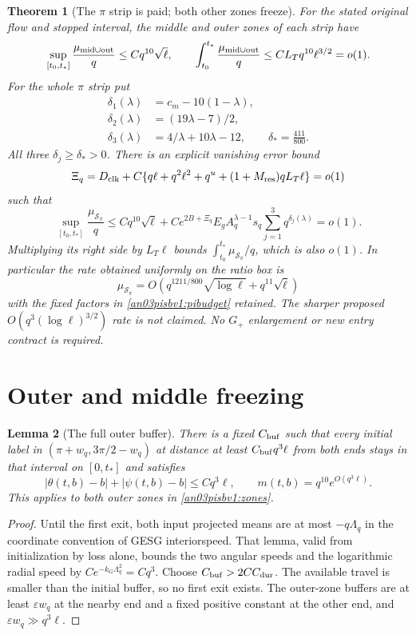 \documentclass[11pt]{article}
\numberwithin{equation}{section}
\newtheorem{theorem}{Theorem}[section]
\newtheorem{lemma}[theorem]{Lemma}
\theoremstyle{remark}\newtheorem{remark}[theorem]{Remark}
\newcommand{\Sp}{\mathcal S_\pi}
\begin{document}
\begin{theorem}[The $\pi$ strip is paid; both other zones freeze]
\label{an03pisbv1:main}
For the stated original flow and stopped interval, the middle and
outer zones of each strip have
\begin{equation}
 \sup_{[t_0,t_*]}\frac{\mu_{\rm mid\cup out}}q
       \le Cq^{10}\sqrt\ell,\qquad
 \int_{t_0}^{t_*}\frac{\mu_{\rm mid\cup out}}q
       \le CL_Tq^{10}\ell^{3/2}=o(1).
 \label{an03pisbv1:frozenbudget}
\end{equation}
For the whole $\pi$ strip put
\begin{align}
 \delta_1(\lambda)&=c_m-10(1-\lambda),\nonumber\\
 \delta_2(\lambda)&=(19\lambda-7)/2,\nonumber\\
 \delta_3(\lambda)&=4/\lambda+10\lambda-12,\qquad
 \delta_*=\frac{411}{800}.                         \label{an03pisbv1:powers}
\end{align}
All three $\delta_j\ge\delta_*>0$. There is an explicit vanishing
error bound
\[
 \Xi_q=D_{\rm clk}
       +C\{q\ell+q^2\ell^2+q^u+(1+M_{\rm res})qL_T\ell\}=o(1)
\]
such that
\begin{equation}
 \sup_{[t_0,t_*]}\frac{\mu_{\Sp}}q
 \le Cq^{10}\sqrt\ell+
     C e^{2B+\Xi_q}E_g A_q^{\lambda-1}s_q
                     \sum_{j=1}^3q^{\delta_j(\lambda)}
 =o(1).
 \label{an03pisbv1:pibudget}
\end{equation}
Multiplying its right side by $L_T\ell$ bounds
$\int_{t_0}^{t_*}\mu_{\Sp}/q$, which is also $o(1)$.
In particular the rate obtained uniformly on the ratio box is
\[
 \mu_{\Sp}
   =O\!\left(q^{1211/800}\sqrt{\log\ell}
                   +q^{11}\sqrt\ell\right)
\]
with the fixed factors in \eqref{an03pisbv1:pibudget} retained.
The sharper proposed $O(q^3(\log\ell)^{3/2})$ rate is not claimed.
No $G_+$ enlargement or new entry contract is required.
\end{theorem}

\section{Outer and middle freezing}
\begin{lemma}[The full outer buffer]
\label{an03pisbv1:outer}
There is a fixed $C_{\rm buf}$ such that every initial label in
$(\pi+w_q,3\pi/2-w_q)$ at distance at least
$C_{\rm buf}q^3\ell$ from both ends stays in that interval on
$[0,t_*]$ and satisfies
\[
 |\theta(t,b)-b|+|\psi(t,b)-b|\le Cq^3\ell,\qquad
 m(t,b)=q^{10}e^{O(q^3\ell)}.
\]
This applies to both outer zones in \eqref{an03pisbv1:zones}.
\end{lemma}
\begin{proof}
Until the first exit, both input projected means are at most
$-q\Lambda_q$ in the coordinate convention of GESG interiorspeed.
That lemma, valid from initialization by loss alone, bounds the
two angular speeds and the logarithmic radial speed by
$Ce^{-k_G\Lambda_q^2}=Cq^3$.
Choose $C_{\rm buf}>2CC_{\rm dur}$. The available travel is smaller
than the initial buffer, so no first exit exists.
The outer-zone buffers are at least $\varepsilon w_q$ at the
nearby end and a fixed positive constant at the other end, and
$\varepsilon w_q\gg q^3\ell$.
\end{proof}
\end{document}
